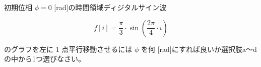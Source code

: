 初期位相 $\phi = 0$ [rad]の時間領域ディジタルサイン波 

\[
f[i] = \frac{\pi}{3} \cdot \sin \left ( \frac{2 \pi}{4}  \cdot i \right )
\]

\noindent のグラフを左に $1$ 点平行移動させるには $\phi$ を何 [rad]にすれば良いか選択肢a〜dの中から1つ選びなさい。
